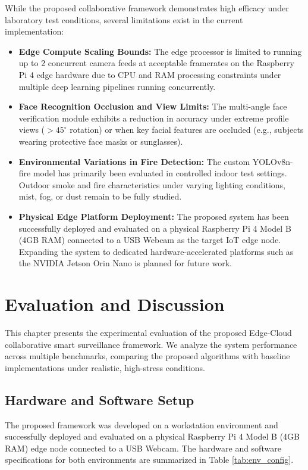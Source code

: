 \documentclass[12pt,a4paper]{article}
\begin{document}
While the proposed collaborative framework demonstrates high efficacy under laboratory test conditions, several limitations exist in the current implementation:
\begin{itemize}
    \item \textbf{Edge Compute Scaling Bounds:} The edge processor is limited to running up to 2 concurrent camera feeds at acceptable framerates on the Raspberry Pi 4 edge hardware due to CPU and RAM processing constraints under multiple deep learning pipelines running concurrently.
    \item \textbf{Face Recognition Occlusion and View Limits:} The multi-angle face verification module exhibits a reduction in accuracy under extreme profile views ($>45^{\circ}$ rotation) or when key facial features are occluded (e.g., subjects wearing protective face masks or sunglasses).
    \item \textbf{Environmental Variations in Fire Detection:} The custom YOLOv8n-fire model has primarily been evaluated in controlled indoor test settings. Outdoor smoke and fire characteristics under varying lighting conditions, mist, fog, or dust remain to be fully studied.
    \item \textbf{Physical Edge Platform Deployment:} The proposed system has been successfully deployed and evaluated on a physical Raspberry Pi 4 Model B (4GB RAM) connected to a USB Webcam as the target IoT edge node. Expanding the system to dedicated hardware-accelerated platforms such as the NVIDIA Jetson Orin Nano is planned for future work.
\end{itemize}

\newpage

\section{Evaluation and Discussion}

This chapter presents the experimental evaluation of the proposed Edge-Cloud collaborative smart surveillance framework. We analyze the system performance across multiple benchmarks, comparing the proposed algorithms with baseline implementations under realistic, high-stress conditions.

\subsection{Hardware and Software Setup}
The proposed framework was developed on a workstation environment and successfully deployed and evaluated on a physical Raspberry Pi 4 Model B (4GB RAM) edge node connected to a USB Webcam. The hardware and software specifications for both environments are summarized in Table \ref{tab:env_config}.
\end{document}
